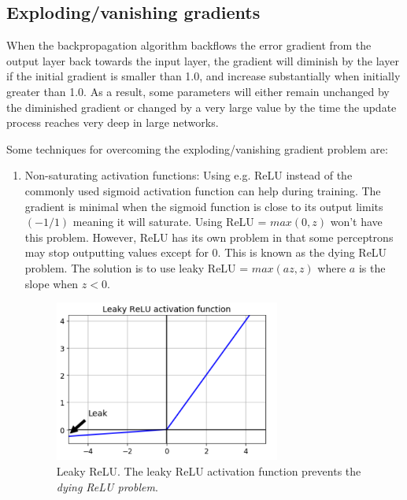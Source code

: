 \documentclass[english, bibtex]{kththesis}
\begin{document}
\subsection{Exploding/vanishing gradients}
When the backpropagation algorithm backflows the error gradient from the output layer back towards the input layer, the gradient will diminish by the layer if the initial gradient is smaller than 1.0, and increase substantially when initially greater than 1.0. As a result, some parameters will either remain unchanged by the diminished gradient or changed by a very large value by the time the update process reaches very deep in large networks.

Some techniques for overcoming the exploding/vanishing gradient problem are\cite{doi:10.1142/S0218488598000094}:

\begin{enumerate}
\item Non-saturating activation functions: Using e.g. ReLU\cite{maas2013rectifier} instead of the commonly used sigmoid activation function can help during training. The gradient is minimal when the sigmoid function is close to its output limits $(-1/1)$ meaning it will saturate. Using ReLU = $max(0,z)$ won't have this problem. However, ReLU has its own problem in that some perceptrons may stop outputting values except for 0. This is known as the dying ReLU problem. The solution is to use leaky ReLU = $max(az,z)$ where $a$ is the slope when $z < 0$. 

\begin{figure}[H]
  \begin{center}
    \includegraphics[width=0.7\textwidth]{figures/leaky_relu.png}
  \end{center}
  \caption{Leaky ReLU\cite{Wang_2019}. The leaky ReLU activation function prevents the \textit{dying ReLU problem}.}
  \label{fig:leaky_relu}
\end{figure}


\end{enumerate}
\end{document}
